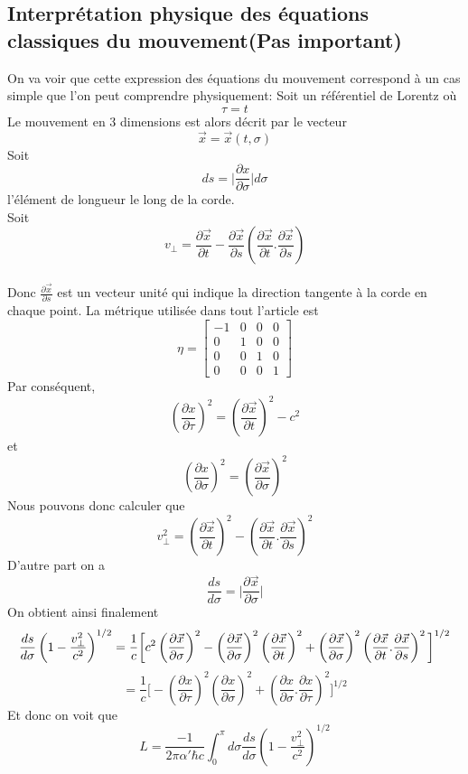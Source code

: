 \documentclass[a4paper,12pt]{article}
\begin{document}
\subsection{Interprétation physique des équations classiques du mouvement(Pas important)}

On va voir que cette expression des équations du mouvement correspond à un cas simple que l'on peut comprendre physiquement: 
Soit un référentiel de Lorentz où $$\tau=t$$
Le mouvement en 3 dimensions est alors décrit par le vecteur 
$$\vec{x}=\vec{x}(t,\sigma)$$
Soit $$ds=\vert\frac{\partial x}{\partial \sigma}\vert d\sigma$$ l'élément de longueur le long de la corde.\\
Soit $$v_{\perp}=\frac{\partial \vec{x}}{\partial t}-\frac{\partial \vec{x}}{\partial s}\left(\frac{\partial \vec{x}}{\partial t}.\frac{\partial \vec{x}}{\partial s}\right)$$\\
Donc $\frac{\partial \vec{x}}{\partial s}$ est un vecteur unité qui indique la direction tangente à la corde en chaque point. 
La métrique utilisée dans tout l'article est
$$
\eta=
\begin{bmatrix}
    -1 & 0 & 0 & 0\\
    0  & 1 & 0 & 0\\
    0  & 0 & 1 & 0\\
    0  & 0 & 0 & 1
\end{bmatrix}
$$
Par conséquent, $$\left(\frac{\partial x}{\partial \tau}\right)^2= \left(\frac{\partial \vec{x}}{\partial t}\right)^2-c^2$$et$$\left(\frac{\partial x}{\partial \sigma}\right)^2= \left(\frac{\partial \vec{x}}{\partial \sigma}\right)^2$$
Nous pouvons donc calculer que $$v_{\perp}^2=\left(\frac{\partial \vec{x}}{\partial t}\right)^2- \left(\frac{\partial \vec{x}}{\partial t}.\frac{\partial \vec{x}}{\partial s}\right)^2$$
D'autre part on a
$$\frac{ds}{d\sigma}=\vert\frac{\partial \vec{x}}{\partial \sigma}\vert$$
On obtient ainsi finalement
\begin{equation}
\frac{ds}{d\sigma}\left(1-\frac{v_{\perp}^2}{c^2}\right)^{1/2}=\frac{1}{c}\bigg[c^2\left(\frac{\partial \vec{x}}{\partial \sigma}\right)^2-\left(\frac{\partial \vec{x}}{\partial \sigma}\right)^2\left(\frac{\partial \vec{x}}{\partial t}\right)^2+\left(\frac{\partial \vec{x}}{\partial \sigma}\right)^2\left(\frac{\partial \vec{x}}{\partial t}.\frac{\partial \vec{x}}{\partial s}\right)^2\bigg]^{1/2}\\
\end{equation}
\begin{equation}
=\frac{1}{c}\bigg[-\left(\frac{\partial x}{\partial\tau}\right)^2\left(\frac{\partial x}{\partial\sigma}\right)^2+\left(\frac{\partial x}{\partial\sigma}.\frac{\partial x}{\partial\tau}\right)^2\bigg]^{1/2}
\end{equation}
Et donc on voit que
\begin{equation}
L=\frac{-1}{2\pi\alpha'\hbar c}\int_{0}^{\pi}d\sigma\frac{ds}{d\sigma}\left(1-\frac{v_{\perp}^2}{c^2}\right)^{1/2}
\end{equation}
\end{document}
